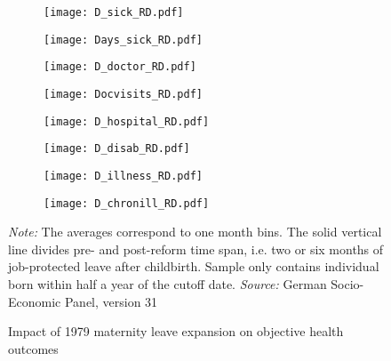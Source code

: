 \documentclass[a4paper ]{article}
\begin{document}
\begin{figure}[p]
\begin{subfigure}[h]{0.48\textwidth}\centering
	\texttt{[image: D\_sick\_RD.pdf]}
\end{subfigure}
\quad
\begin{subfigure}[h]{0.48\textwidth}\centering
	\texttt{[image: Days\_sick\_RD.pdf]}
\end{subfigure}

\begin{subfigure}[h]{0.48\textwidth}\centering
	\texttt{[image: D\_doctor\_RD.pdf]}
\end{subfigure}
\quad
\begin{subfigure}[h]{0.48\textwidth}\centering
	\texttt{[image: Docvisits\_RD.pdf]}
\end{subfigure}



\begin{subfigure}[h]{0.48\textwidth}\centering
	\texttt{[image: D\_hospital\_RD.pdf]}
\end{subfigure}
\quad
\begin{subfigure}[h]{0.48\textwidth}\centering
	\texttt{[image: D\_disab\_RD.pdf]}
\end{subfigure}

\begin{subfigure}[h]{0.48\textwidth}\centering
	\texttt{[image: D\_illness\_RD.pdf]}
\end{subfigure}
\quad
\begin{subfigure}[h]{0.48\textwidth}\centering
	\texttt{[image: D\_chronill\_RD.pdf]}
\end{subfigure}

\caption{Impact of 1979 maternity leave expansion on objective health outcomes}\label{fig: RD_OH}
\begin{minipage}{\textwidth} %
{\footnotesize \textit{Note:} The averages correspond to one month bins. The solid vertical line divides pre- and post-reform time span, i.e. two or six months of job-protected leave after childbirth. Sample only contains individual born within half a year of the cutoff date. \newline \textit{Source: }German Socio-Economic Panel, version 31\par}
\end{minipage}
\end{figure}
\newpage
\end{document}
